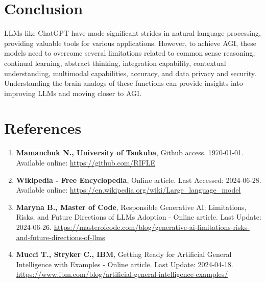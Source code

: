 \documentclass[a4paper,10.5pt]{article}
\begin{document}
\section{Conclusion}
LLMs like ChatGPT have made significant strides in natural language processing, providing valuable tools for various applications. However, to achieve AGI, these models need to overcome several limitations related to common sense reasoning, continual learning, abstract thinking, integration capability, contextual understanding, multimodal capabilities, accuracy, and data privacy and security. Understanding the brain analogs of these functions can provide insights into improving LLMs and moving closer to AGI.

\section*{References}
\begin{enumerate}
    \item \textbf{Mamanchuk N., University of Tsukuba}, Github access. \today. Available online: \url{https://github.com/RIFLE}
    \item \textbf{Wikipedia - Free Encyclopedia}, Online article. Last Accessed: 2024-06-28. Available online: \url{https://en.wikipedia.org/wiki/Large_language_model}
    \item \textbf{Maryna B., Master of Code}, Responsible Generative AI: Limitations, Risks, and Future Directions of LLMs Adoption - Online article. Last Update: 2024-06-26. \url{https://masterofcode.com/blog/generative-ai-limitations-risks-and-future-directions-of-llms}
    \item \textbf{Mucci T., Stryker C., IBM}, Getting Ready for Artificial General Intelligence with Examples - Online article. Last Update: 2024-04-18.
     \\ \url{https://www.ibm.com/blog/artificial-general-intelligence-examples/}
\end{enumerate}
\end{document}
